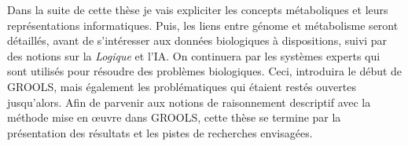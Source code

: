 \begin{refsegment}

Dans la suite de cette thèse je vais expliciter les concepts métaboliques et leurs représentations informatiques. Puis, les liens entre génome et métabolisme seront détaillés, avant de s'intéresser aux données biologiques à dispositions, suivi par des notions sur la \textit{Logique} et l'\gls{IA}. On continuera par les systèmes experts qui sont utilisés pour résoudre des problèmes biologiques. Ceci, introduira le début de \gls{GROOLS}, mais également les problématiques qui étaient restés ouvertes jusqu'alors. Afin de parvenir aux notions de raisonnement descriptif avec la méthode mise en œuvre dans \gls{GROOLS}, cette thèse se termine par la présentation des résultats et les pistes de recherches envisagées.


\subbibliography
\end{refsegment}
